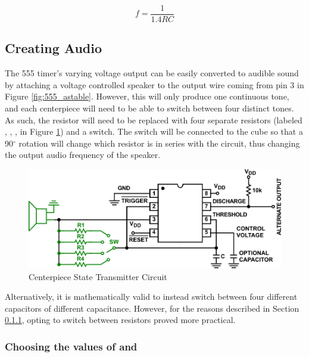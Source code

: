 \begin{equation}\label{eq:555-freq}
    f = \frac{1}{1.4 R C}
\end{equation}

\subsection{Creating Audio}

The 555 timer's varying voltage output can be easily converted to
audible sound by attaching a voltage controlled speaker to the output
wire coming from pin 3 in Figure \ref{fig:555_astable}. However, this
will only produce one continuous tone, and each centerpiece will need
to be able to switch between four distinct tones. As such, the resistor
 will need to be replaced with four separate resistors (labeled
, , ,  in Figure
\ref{fig:555_astable_modded}) and a switch. The switch will be
connected to the cube so that a 90$^\circ$ rotation will change which
resistor is in series with the circuit, thus changing the output audio
frequency of the speaker.

\begin{figure}[h]
    \centering
    \caption{Centerpiece State Transmitter Circuit}
    \label{fig:555_astable_modded}
    \includegraphics[width=\linewidth]{Figures/6 PCB Design/555_astable_modded.png}
\end{figure}

Alternatively, it is mathematically valid to instead switch between
four different capacitors of different capacitance. However, for the
reasons described in Section \ref{subsubsec:freq-selection}, opting to
switch between resistors proved more practical.

\subsubsection{Choosing the values of  and }
\label{subsubsec:freq-selection}

